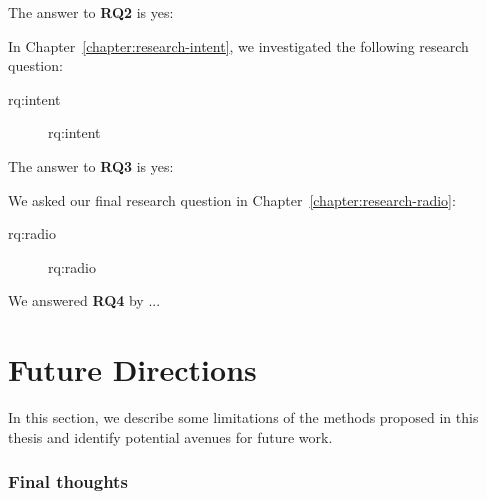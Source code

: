 \noindent
The answer to \textbf{RQ2} is yes:

In Chapter~\ref{chapter:research-intent}, we investigated the following research question:

\begin{description}\item[\acs{rq:intent}]\acl{rq:intent}\end{description}

\noindent
The answer to \textbf{RQ3} is yes: 

We asked our final research question in Chapter~\ref{chapter:research-radio}:

\begin{description}\item[\acs{rq:radio}]\acl{rq:radio}\end{description}

\noindent
We answered \textbf{RQ4} by ...

\section{Future Directions}
\label{section:conclusion-futurework}
In this section, we describe some limitations of the methods proposed in this thesis and identify potential avenues for future work. 

\pagebreak

\subsubsection{Final thoughts} 






